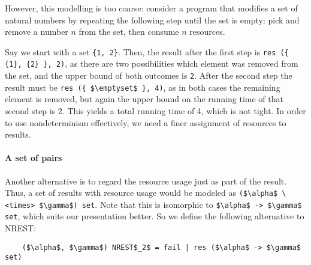 \documentclass[acmsmall]{acmart}
\newcommand{\is}{\lstinline[language=isabelle]}
\begin{document}
However, this modelling is too coarse:
consider a program that modifies a set of natural numbers by repeating the following step until the set is empty:
pick and remove a number $n$ from the set, then consume $n$ resources.



Say we start with a set \is!{1, 2}!. Then, the result after the first step is \is!res ({ {1}, {2} }, 2)!, as there are two possibilities which element was removed from the set, and the upper bound of both outcomes is \is{2}. 
After the second step the result must be \is!res ({ $\emptyset$ }, 4)!, as in both cases the remaining element is removed, but again the upper bound on the running time of that second step is 2.
This yields a total running time of 4, which is not tight.
%
%
\clearpage
In order to use nondeterminism effectively, we need a finer assignment of resources to results.



\paragraph{A set of pairs}
Another alternative is to regard the resource usage just as part of the result. 
Thus, a set of results with resource usage would be modeled as \is{($\alpha$ \<times> $\gamma$) set}.
Note that this is isomorphic to \is{$\alpha$ -> $\gamma$ set}, which suits our presentation better.
%
%
So we define the following alternative to NREST:

\begin{lstlisting}
    ($\alpha$, $\gamma$) NREST$_2$ = fail | res ($\alpha$ -> $\gamma$ set)
\end{lstlisting}
\end{document}
